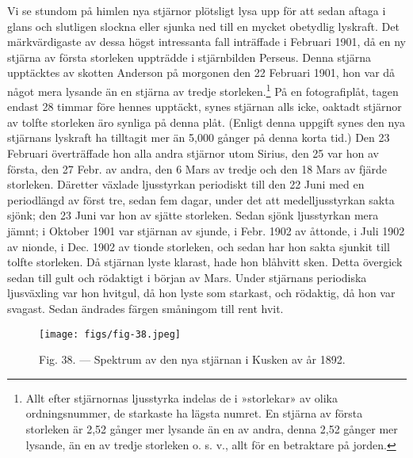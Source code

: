 \documentclass[a4paper, 12pt, oneside, swedish]{article}
\begin{document}
Vi se stundom på himlen nya stjärnor plötsligt lysa upp för att sedan aftaga i glans och slutligen slockna eller sjunka ned till en mycket obetydlig lyskraft. Det märkvärdigaste av dessa högst intressanta fall inträffade i Februari 1901, då en ny stjärna av första storleken uppträdde i stjärnbilden Perseus. Denna stjärna upptäcktes av skotten Anderson på morgonen den 22 Februari 1901, hon var då något mera lysande än en stjärna av tredje storleken.\footnote{Allt efter stjärnornas ljusstyrka indelas de i »storlekar» av olika ordningsnummer, de starkaste ha lägsta numret. En stjärna av första storleken är 2,52 gånger mer lysande än en av andra, denna 2,52 gånger mer lysande, än en av tredje storleken o. s. v., allt för en betraktare på jorden.} På en fotografiplåt, tagen endast 28 timmar före hennes upptäckt, synes stjärnan alls icke, oaktadt stjärnor av tolfte storleken äro synliga på denna plåt. (Enligt denna uppgift synes den nya stjärnans lyskraft ha tilltagit mer än 5,000 gånger på denna korta tid.) Den 23 Februari överträffade hon alla andra stjärnor utom Sirius, den 25 var hon av första, den 27 Febr. av andra, den 6 Mars av tredje och den 18 Mars av fjärde storleken. Däretter växlade ljusstyrkan periodiskt till den 22 Juni med en periodlängd av först tre, sedan fem dagar, under det att medelljusstyrkan sakta sjönk; den 23 Juni var hon av sjätte storleken. Sedan sjönk ljusstyrkan mera jämnt; i Oktober 1901 var stjärnan av sjunde, i Febr. 1902 av åttonde, i Juli 1902 av nionde, i Dec. 1902 av tionde storleken, och sedan har hon sakta sjunkit till tolfte storleken. Då stjärnan lyste klarast, hade hon blåhvitt sken. Detta övergick sedan till gult och rödaktigt i början av Mars. Under stjärnans periodiska ljusväxling var hon hvitgul, då hon lyste som starkast, och rödaktig, då hon var svagast. Sedan ändrades färgen småningom till rent hvit.

\begin{figure}[H]
\centering
\texttt{[image: figs/fig-38.jpeg]}
\caption{Fig. 38. --- Spektrum av den nya stjärnan i Kusken av år 1892.}
\end{figure}
\end{document}
